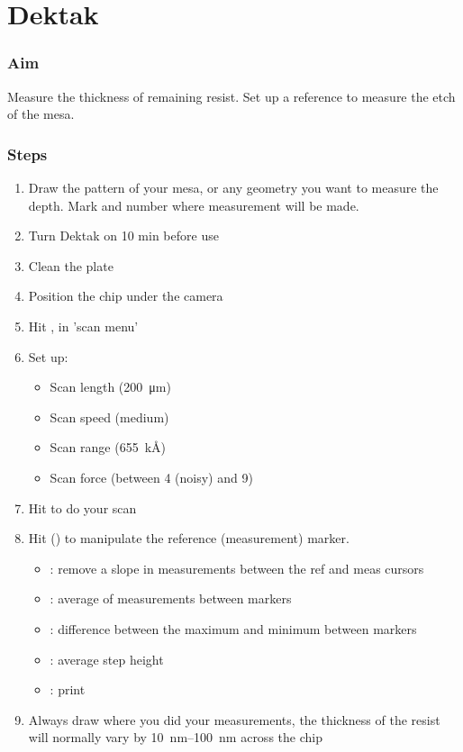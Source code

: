 \section{Dektak}

\subsubsection{Aim}
Measure the thickness of remaining resist. Set up a reference to measure the etch of the mesa.

\subsubsection{Steps}
\begin{enumerate}
\item Draw the pattern of your mesa, or any geometry you want to measure the depth. Mark and number where measurement will be made.
\item Turn Dektak on 10 min before use
\item Clean the plate
\item Position the chip under the camera
\item Hit ,  in 'scan menu'
\item Set up:
\begin{itemize}[nolistsep, noitemsep]
  \item Scan length (\SI{200}{\micro\meter})
  \item Scan speed (medium)
  \item Scan range (\SI{655}{\kilo\angstrom})
  \item Scan force (between 4 (noisy) and 9)
\end{itemize}
\item Hit  to do your scan
\item Hit  () to manipulate the reference (measurement) marker.
\begin{itemize}[nolistsep, noitemsep]
  \item \noindent {}: remove a slope in measurements between the ref and meas cursors
  \item {}: average of measurements between markers
  \item {}: difference between the maximum and minimum between markers
  \item {}: average step height
  \item {}: print
\end{itemize}
\item Always draw where you did your measurements, the thickness of the resist will normally vary by \SIrange{10}{100}{\nano\meter} across the chip
\end{enumerate}


